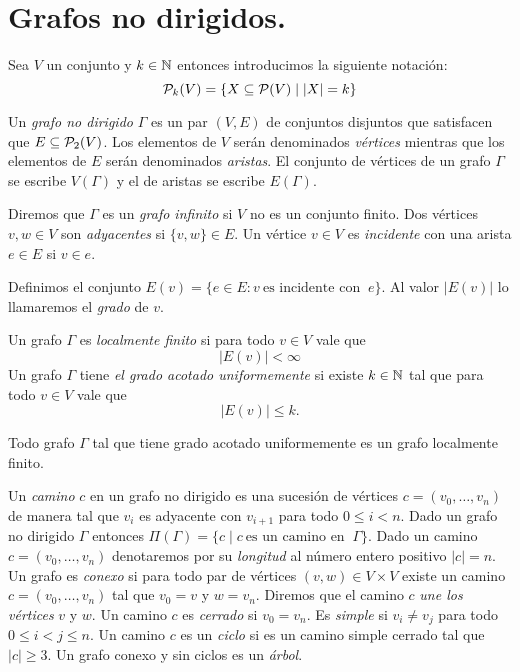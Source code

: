 \documentclass[tesis.tex]{subfiles}
\begin{document}
\section{Grafos no dirigidos.}\label{secc_graf_nd}

Sea $V$ un conjunto y $k \in \mathbb{N}$ entonces introducimos la siguiente notación:
\[
	{\cal P}_k(V) = \{ X \subseteq {\cal P}(V) \mid |X| = k   \}
\]

\begin{deff}
	Un \emph{grafo no dirigido} $\Gamma$ es un par $(V,E)$ de conjuntos disjuntos que satisfacen que
	$E \subseteq {\cal P}_{2}(V)$.
	Los elementos de $V$ serán denominados \emph{vértices} mientras que los elementos de $E$ serán denominados \emph{aristas}.
	El conjunto de vértices de un grafo $\Gamma$ se escribe $V(\Gamma)$ y el de aristas se escribe $E(\Gamma)$.
\end{deff}


Diremos que $\Gamma$ es un \emph{grafo infinito} si $V$ no es un conjunto finito.
Dos vértices $v,w \in V$ son \emph{adyacentes} si $\{v,w \} \in E$.
Un vértice $v \in V$ es \emph{incidente} con una arista $e \in E$ si $v \in e$.

Definimos el conjunto $E(v) = \{  e \in E : v \ \text{es incidente con } \ e \}$.
Al valor $|E(v)|$ lo llamaremos el \emph{grado} de $v$.


\begin{deff}
	Un grafo $\Gamma$ es \emph{localmente finito} si para todo $v \in V$ vale que
	\[
		| E(v) | < \infty
	\]
	Un grafo $\Gamma$ tiene \emph{el grado acotado uniformemente} si existe $k \in \mathbb{N}$ tal que para todo $v \in V$ vale que 
	\[
		|E(v)| \le k.
	\]
\end{deff}
\begin{obs}
	Todo grafo $\Gamma$ tal que tiene grado acotado uniformemente es un grafo localmente finito.
\end{obs}

Un \emph{camino} $c$ en un grafo no dirigido es una sucesión de vértices $c=(v_{0}, \dots, v_{n})$ de manera tal que $v_{i}$ es adyacente con $v_{i+1}$ para todo $0 \le i < n$.
Dado un grafo no dirigido $\Gamma$ entonces $\Pi (\Gamma) = \{  c \mid c \ \text{es un camino en } \ \Gamma \}$.
Dado un camino $c = (v_{0}, \dots, v_{n})$ denotaremos por su \emph{longitud} al número entero positivo $|c|= n$.
Un grafo es \emph{conexo} si para todo par de vértices $(v,w) \in V \times V$ existe un camino $c = (v_{0}, \dots, v_{n})$ tal que $v_{0} = v$ y $w=v_{n}$.
Diremos que el camino $c$ \emph{une los vértices} $v$ y $w$.
Un camino $c$ es \emph{cerrado} si $v_{0} = v_{n}$.
Es \emph{simple} si $v_{i} \neq v_{j}$ para todo $0 \le i < j \le n$.
Un camino $c$ es un \emph{ciclo} si es un camino simple cerrado tal que $|c| \ge 3$.
Un grafo conexo y sin ciclos es un \emph{árbol}.
\end{document}
